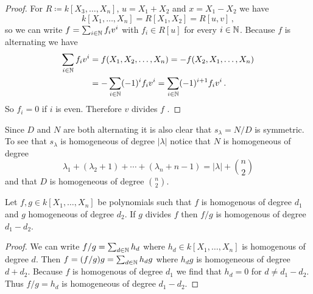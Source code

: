 \begin{expl}[]
\begin{proof}
    For $R \coloneqq k[X_3, \dotsc, X_n]$, $u = X_1 + X_2$ and $x = X_1 - X_2$ we have
    \[
        k[X_1, \dotsc, X_n]
      = R[X_1, X_2]
      = R[u,v] \,,
    \]
    so we can write $f = \sum_{i \in \mathbb{N}} f_i v^i$ with $f_i \in R[u]$ for every $i \in \mathbb{N}$.
    Because $f$ is alternating we have
    \begin{align*}
           \sum_{i \in \mathbb{N}} f_i v^i
      &=   f(X_1, X_2, \dotsc, X_n)
       =  -f(X_2, X_1, \dotsc, X_n) \\
      &=  -\sum_{i \in \mathbb{N}} (-1)^i f_i v^i
       =   \sum_{i \in \mathbb{N}} (-1)^{i+1} f_i v^i \,.
    \end{align*}
    So $f_i = 0$ if $i$ is even.
    Therefore $v$ divides $f$ .
  \end{proof}
  Since $D$ and $N$ are both alternating it is also clear that $s_\lambda = N/D$ is symmetric.
  To see that $s_\lambda$ is homogeneous of degree $|\lambda|$ notice that $N$ is homogeneous of degree
  \[
      \lambda_1 + (\lambda_2 + 1) + \dotsb + (\lambda_n + n-1)
    = |\lambda| + \binom{n}{2}
  \]
  and that $D$ is homogeneous of degree $\binom{n}{2}$.
  \begin{claim}
    Let $f, g \in k[X_1, \dotsc, X_n]$ be polynomials such that $f$ is homogenous of degree $d_1$ and $g$ homogeneous of degree $d_2$.
    If $g$ divides $f$ then $f/g$ is homogenous of degree $d_1 - d_2$.
  \end{claim}
  \begin{proof}
    We can write $f/g = \sum_{d \in \mathbb{N}} h_d$ where $h_d \in k[X_1, \dotsc, X_n]$ is homogenous of degree $d$.
    Then $f = (f/g)g = \sum_{d \in \mathbb{N}} h_d g$ where $h_d g$ is homogeneous of degree $d + d_2$.
    Because $f$ is homogenous of degree $d_1$ we find that $h_d = 0$ for $d \neq d_1 - d_2$.
    Thus $f/g = h_d$ is homogeneous of degree $d_1 - d_2$.
  \end{proof}
\end{expl}


